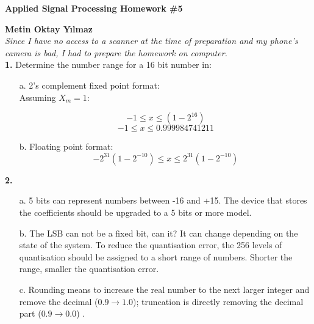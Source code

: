 \documentclass[12pt,a4paper]{report}
\author{Metin Oktay Yılmaz}
\begin{document}
	\textbf{Applied Signal Processing Homework \#5}

	\vspace{1cm}
	\textbf{Metin Oktay Yılmaz}\\

	\textit{Since I have no access to a scanner at the time of preparation and my phone's camera is bad, I had to prepare the homework on computer.} \\

	\textbf{1.} Determine the number range for a 16 bit number in:
	\begin{itemize}
		\item[a.]  2's complement fixed point format: \\

		Assuming $X_m = 1$:

		$$ -1 \le x \le (1-2^{16})$$
		$$ -1 \le x \le 0.999984741211$$

		\item[b.] Floating point format: \\
		$$-2^{31}(1-2^{-10}) \le x \le 2^{31}(1-2^{-10})$$
	\end{itemize}

	\textbf{2.}
	\begin{itemize}
		\item[a.] 5 bits can represent numbers between -16 and +15. The device that stores the coefficients should be upgraded to a 5 bits or more model.
		\item[b.] The LSB can not be a fixed bit, can it? It can change depending on the state of the system. To reduce the quantisation error, the 256 levels of quantisation should be assigned to a short range of numbers. Shorter the range, smaller the quantisation error.
		\item[c.] Rounding means to increase the real number to the next larger integer and remove the decimal ($0.9 \rightarrow 1.0$); truncation is directly removing the decimal part ($0.9 \rightarrow 0.0$) .
	\end{itemize}
\end{document}
